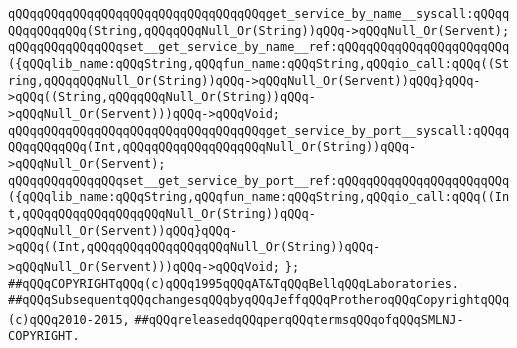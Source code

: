 \newline
\verb|qQQqqQQqqQQqqQQqqQQqqQQqqQQqqQQqqQQqget_service_by_name__syscall:qQQqqQQqqQQqqQQq(String,qQQqqQQqNull_Or(String))qQQq->qQQqNull_Or(Servent);|\newline
\verb|qQQqqQQqqQQqqQQqset__get_service_by_name__ref:qQQqqQQqqQQqqQQqqQQqqQQq({qQQqlib_name:qQQqString,qQQqfun_name:qQQqString,qQQqio_call:qQQq((String,qQQqqQQqNull_Or(String))qQQq->qQQqNull_Or(Servent))qQQq}qQQq->qQQq((String,qQQqqQQqNull_Or(String))qQQq->qQQqNull_Or(Servent)))qQQq->qQQqVoid;|\newline
\newline
\verb|qQQqqQQqqQQqqQQqqQQqqQQqqQQqqQQqqQQqget_service_by_port__syscall:qQQqqQQqqQQqqQQq(Int,qQQqqQQqqQQqqQQqqQQqNull_Or(String))qQQq->qQQqNull_Or(Servent);|\newline
\verb|qQQqqQQqqQQqqQQqset__get_service_by_port__ref:qQQqqQQqqQQqqQQqqQQqqQQq({qQQqlib_name:qQQqString,qQQqfun_name:qQQqString,qQQqio_call:qQQq((Int,qQQqqQQqqQQqqQQqqQQqNull_Or(String))qQQq->qQQqNull_Or(Servent))qQQq}qQQq->qQQq((Int,qQQqqQQqqQQqqQQqqQQqNull_Or(String))qQQq->qQQqNull_Or(Servent)))qQQq->qQQqVoid;|\newline
\newline
\newline
\verb|};|\newline
\newline
\newline
\newline
\verb|##qQQqCOPYRIGHTqQQq(c)qQQq1995qQQqAT&TqQQqBellqQQqLaboratories.|\newline
\verb|##qQQqSubsequentqQQqchangesqQQqbyqQQqJeffqQQqProtheroqQQqCopyrightqQQq(c)qQQq2010-2015,|\newline
\verb|##qQQqreleasedqQQqperqQQqtermsqQQqofqQQqSMLNJ-COPYRIGHT.|\newline

